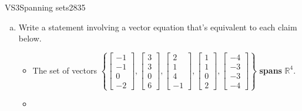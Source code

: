 \begin{exercise}{VS3}{Spanning sets}{2835} 
\begin{exerciseStatement} 

\begin{enumerate}[(a)]
\item  

 Write a statement involving a vector equation that's equivalent to each claim below. 

 

\begin{itemize}
\item  

 The set of vectors \(\left\{ \left[\begin{array}{c}
-1 \\
-1 \\
0 \\
-2
\end{array}\right] , \left[\begin{array}{c}
3 \\
3 \\
0 \\
6
\end{array}\right] , \left[\begin{array}{c}
2 \\
1 \\
4 \\
-1
\end{array}\right] , \left[\begin{array}{c}
1 \\
1 \\
0 \\
2
\end{array}\right] , \left[\begin{array}{c}
-4 \\
-3 \\
-3 \\
-4
\end{array}\right] \right\}\) \textbf{spans} \(\mathbb R^4\). 

 
\item  


\end{itemize}
\end{enumerate}
\end{exerciseStatement}
\end{exercise}
